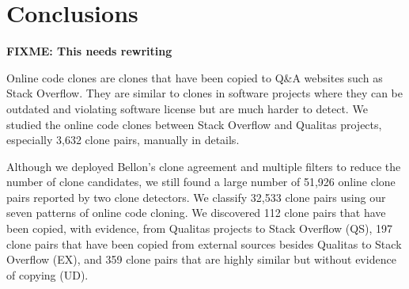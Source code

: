\documentclass[sigconf,review, anonymous]{acmart}
\newcommand\FIXME[1]{\textbf{FIXME: #1}}
\begin{document}
%

\section{Conclusions}

\FIXME{This needs rewriting}

Online code clones are clones that have been copied to Q\&A websites
such as Stack Overflow. They are similar to clones in software
projects where they can be outdated and violating software license but
are much harder to detect. We studied the online code clones between
Stack Overflow and Qualitas projects, especially 3,632 clone pairs,
manually in details.

Although we deployed Bellon's clone agreement and multiple filters to
reduce the number of clone candidates, we still found a large number
of 51,926 online clone pairs reported by two clone detectors. We
classify 32,533 clone pairs using our seven patterns of online code
cloning. We discovered 112 clone pairs that have been copied, with
evidence, from Qualitas projects to Stack Overflow (QS), 197 clone
pairs that have been copied from external sources besides Qualitas to
Stack Overflow (EX), and 359 clone pairs that are highly similar but
without evidence of copying (UD).
\end{document}
